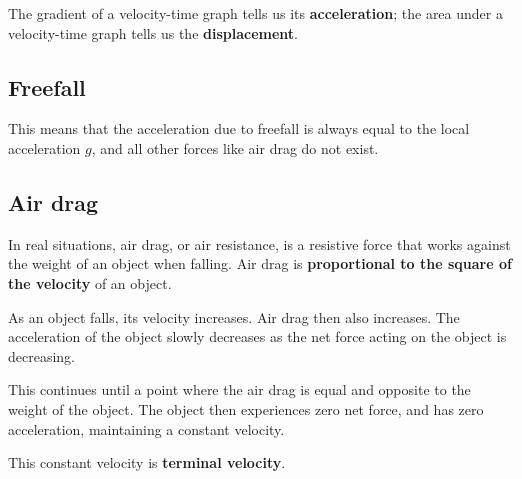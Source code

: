 \documentclass[../main.tex]{subfiles}
\begin{document}
		The gradient of a velocity-time graph tells us its \textbf{acceleration}; the area under a velocity-time graph tells us the \textbf{displacement}.
		
		\subsection{Freefall}
		This means that the acceleration due to freefall is always equal to the local acceleration \(g\), and all other forces like air drag do not exist.
		\begin{center}
		\end{center}
		
		\subsection{Air drag}
		In real situations, air drag, or air resistance, is a resistive force that works against the weight of an object when falling. Air drag is \textbf{proportional to the square of the velocity} of an object.
		
		As an object falls, its velocity increases. Air drag then also increases. The acceleration of the object slowly decreases as the net force acting on the object is decreasing. 
		
		This continues until a point where the air drag is equal and opposite to the weight of the object. The object then experiences zero net force, and has zero acceleration, maintaining a constant velocity. 
		
		This constant velocity is \textbf{terminal velocity}.
		
\end{document}
